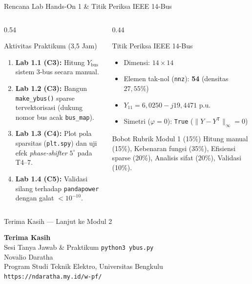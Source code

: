 \documentclass[aspectratio=169,10pt]{beamer}
\begin{document}
\begin{frame}{Rencana Lab Hands-On 1 \& Titik Periksa IEEE 14-Bus}
  \begin{columns}[T]
    \begin{column}{0.54\textwidth}
      \begin{block}{Aktivitas Praktikum (3,5 Jam)}
        \begin{enumerate}
          \item \textbf{Lab 1.1 (C3):} Hitung $Y_{\text{bus}}$ sistem 3-bus secara manual.
          \item \textbf{Lab 1.2 (C3):} Bangun \texttt{make\_ybus()} sparse tervektorisasi (dukung nomor bus acak \texttt{bus\_map}).
          \item \textbf{Lab 1.3 (C4):} Plot pola sparsitas (\texttt{plt.spy}) dan uji efek \textit{phase-shifter} $5^\circ$ pada T4--7.
          \item \textbf{Lab 1.4 (C5):} Validasi silang terhadap \texttt{pandapower} dengan galat $<10^{-10}$.
        \end{enumerate}
      \end{block}
    \end{column}
    \begin{column}{0.44\textwidth}
      \begin{exampleblock}{Titik Periksa IEEE 14-Bus}
        \begin{itemize}
          \item Dimensi: $14 \times 14$
          \item Elemen tak-nol (\texttt{nnz}): \textbf{54} (densitas $27{,}55\%$)
          \item $Y_{11} = 6{,}0250 - j19{,}4471\text{ p.u.}$
          \item Simetri ($\varphi=0$): \texttt{True} ($\|Y-Y^{\mathsf{T}}\|_\infty = 0$)
        \end{itemize}
      \end{exampleblock}
      \begin{alertblock}{Bobot Rubrik Modul 1 (15\%)}
        Hitung manual (15\%), Kebenaran fungsi (35\%), Efisiensi sparse (20\%), Analisis sifat (20\%), Validasi (10\%).
      \end{alertblock}
    \end{column}
  \end{columns}
\end{frame}

\begin{frame}{Terima Kasih — Lanjut ke Modul 2}
  \begin{center}
    \vspace{0.8cm}
    {\Large \textbf{Terima Kasih}}\\
    \vspace{0.4cm}
    {\large Sesi Tanya Jawab \& Praktikum \texttt{python3 ybus.py}}\\
    \vspace{1.2cm}
    Novalio Daratha\\
    Program Studi Teknik Elektro, Universitas Bengkulu\\
    \texttt{https://ndaratha.my.id/w-pf/}
  \end{center}
\end{frame}
\end{document}
